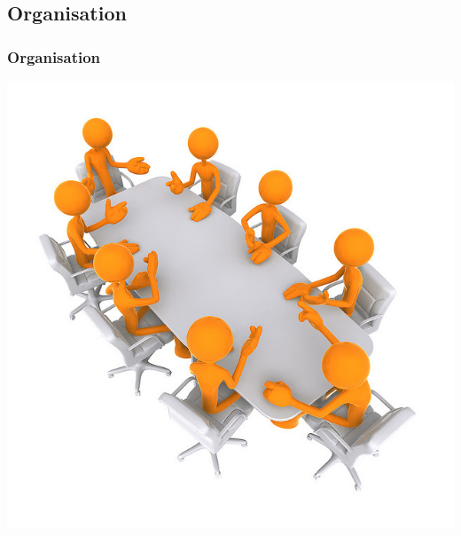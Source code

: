 \subsection{Organisation}
\begin{frame}
	\frametitle{Organisation}
	\begin{center}
	\includegraphics[scale=1.2]{Images/organisation}
	\end{center}
\end{frame}
